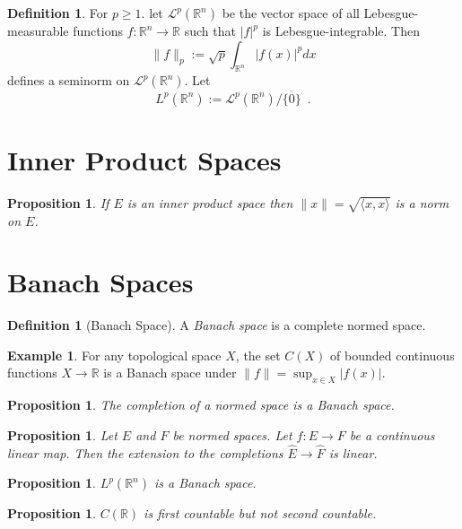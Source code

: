 \documentclass{book}
\newtheorem{prop}[ax]{Proposition}
\theoremstyle{definition}
\newtheorem{df}[ax]{Definition}
\newtheorem{ex}[ax]{Example}
\begin{document}
\begin{df}
For $p \geq 1$. let $\mathcal{L}^p(\mathbb{R}^n)$ be the vector space of all Lebesgue-measurable functions $f : \mathbb{R}^n \rightarrow \mathbb{R}$ such that $|f|^p$ is Lebesgue-integrable. Then
\[ \| f \|_p := \sqrt{p}{\int_{\mathbb{R}^n} |f(x)|^p dx} \]
defines a seminorm on $\mathcal{L}^p(\mathbb{R}^n)$. Let
\[ L^p(\mathbb{R}^n) := \mathcal{L}^p(\mathbb{R}^n) / \overline{\{0\}} \enspace . \]
\end{df}

\section{Inner Product Spaces}

\begin{prop}
If $E$ is an inner product space then $\| x \| = \sqrt{\langle x,x \rangle}$ is a norm on $E$.
\end{prop}

\section{Banach Spaces}

\begin{df}[Banach Space]
A \emph{Banach space} is a complete normed space.
\end{df}

\begin{ex}
For any topological space $X$, the set $C(X)$ of bounded continuous functions $X \rightarrow \mathbb{R}$ is a Banach space under $\| f \| = \sup_{x \in X} |f(x)|$.
\end{ex}

\begin{prop}
The completion of a normed space is a Banach space.
\end{prop}

\begin{prop}
Let $E$ and $F$ be normed spaces. Let $f : E \rightarrow F$ be a continuous linear map. Then the extension to the completions $\hat{E} \rightarrow \hat{F}$ is linear.
\end{prop}

\begin{prop}
$L^p(\mathbb{R}^n)$ is a Banach space.
\end{prop}

\begin{prop}
$C(\mathbb{R})$ is first countable but not second countable.
\end{prop}
\end{document}
